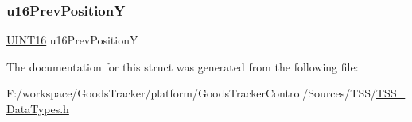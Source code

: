 \subsubsection{\texorpdfstring{u16\+Prev\+PositionY}{u16PrevPositionY}}
{\footnotesize\ttfamily \hyperlink{_t_s_s___data_types_8h_a09f1a1fb2293e33483cc8d44aefb1eb1}{U\+I\+N\+T16} u16\+Prev\+PositionY}



The documentation for this struct was generated from the following file\+:\begin{DoxyCompactItemize}
\item 
F\+:/workspace/\+Goods\+Tracker/platform/\+Goods\+Tracker\+Control/\+Sources/\+T\+S\+S/\hyperlink{_t_s_s___data_types_8h}{T\+S\+S\+\_\+\+Data\+Types.\+h}\end{DoxyCompactItemize}
